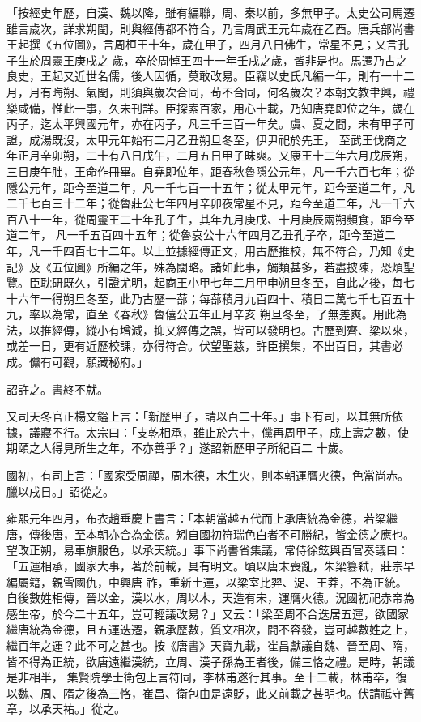 \begin{pinyinscope}
 「按經史年歷，自漢、魏以降，雖有編聯，周、秦以前，多無甲子。太史公司馬遷雖言歲次，詳求朔閏，則與經傳都不符合，乃言周武王元年歲在乙酉。唐兵部尚書王起撰《五位圖》，言周桓王十年，歲在甲子，四月八日佛生，常星不見；又言孔子生於周靈王庚戌之
 歲，卒於周悼王四十一年壬戌之歲，皆非是也。馬遷乃古之良史，王起又近世名儒，後人因循，莫敢改易。臣竊以史氏凡編一年，則有一十二月，月有晦朔、氣閏，則須與歲次合同，茍不合同，何名歲次？本朝文教聿興，禮樂咸備，惟此一事，久未刊詳。臣探索百家，用心十載，乃知唐堯即位之年，歲在丙子，迄太平興國元年，亦在丙子，凡三千三百一年矣。虞、夏之間，未有甲子可證，成湯既沒，太甲元年始有二月乙丑朔旦冬至，伊尹祀於先王，
 至武王伐商之年正月辛卯朔，二十有八日戊午，二月五日甲子昧爽。又康王十二年六月戊辰朔，三日庚午朏，王命作冊畢。自堯即位年，距春秋魯隱公元年，凡一千六百七年；從隱公元年，距今至道二年，凡一千七百一十五年；從太甲元年，距今至道二年，凡二千七百三十二年；從魯莊公七年四月辛卯夜常星不見，距今至道二年，凡一千六百八十一年，從周靈王二十年孔子生，其年九月庚戌、十月庚辰兩朔頻食，距今至道二年，
 凡一千五百四十五年；從魯哀公十六年四月乙丑孔子卒，距今至道二年，凡一千四百七十二年。以上並據經傳正文，用古歷推校，無不符合，乃知《史記》及《五位圖》所編之年，殊為闊略。諸如此事，觸類甚多，若盡披陳，恐煩聖覽。臣耽研既久，引證尤明，起商王小甲七年二月甲申朔旦冬至，自此之後，每七十六年一得朔旦冬至，此乃古歷一蔀；每蔀積月九百四十、積日二萬七千七百五十九，率以為常，直至《春秋》魯僖公五年正月辛亥
 朔旦冬至，了無差爽。用此為法，以推經傳，縱小有增減，抑又經傳之誤，皆可以發明也。古歷到齊、梁以來，或差一日，更有近歷校課，亦得符合。伏望聖慈，許臣撰集，不出百日，其書必成。儻有可觀，願藏秘府。」



 詔許之。書終不就。



 又司天冬官正楊文鎰上言：「新歷甲子，請以百二十年。」事下有司，以其無所依據，議寢不行。太宗曰：「支乾相承，雖止於六十，儻再周甲子，成上壽之數，使期頤之人得見所生之年，不亦善乎？」遂詔新歷甲子所紀百二
 十歲。



 國初，有司上言：「國家受周禪，周木德，木生火，則本朝運膺火德，色當尚赤。臘以戌日。」詔從之。



 雍熙元年四月，布衣趙垂慶上書言：「本朝當越五代而上承唐統為金德，若梁繼唐，傳後唐，至本朝亦合為金德。矧自國初符瑞色白者不可勝紀，皆金德之應也。望改正朔，易車旗服色，以承天統。」事下尚書省集議，常侍徐鉉與百官奏議曰：「五運相承，國家大事，著於前載，具有明文。頃以唐末喪亂，朱梁篡弒，莊宗早編屬籍，親雪國仇，中興唐
 祚，重新土運，以梁室比羿、浞、王莽，不為正統。自後數姓相傳，晉以金，漢以水，周以木，天造有宋，運膺火德。況國初祀赤帝為感生帝，於今二十五年，豈可輕議改易？」又云：「梁至周不合迭居五運，欲國家繼唐統為金德，且五運迭遷，親承歷數，質文相次，間不容發，豈可越數姓之上，繼百年之運？此不可之甚也。按《唐書》天寶九載，崔昌獻議自魏、晉至周、隋，皆不得為正統，欲唐遠繼漢統，立周、漢子孫為王者後，備三恪之禮。是時，朝議是非相半，
 集賢院學士衛包上言符同，李林甫遂行其事。至十二載，林甫卒，復以魏、周、隋之後為三恪，崔昌、衛包由是遠貶，此又前載之甚明也。伏請祗守舊章，以承天祐。」從之。




\end{pinyinscope}
